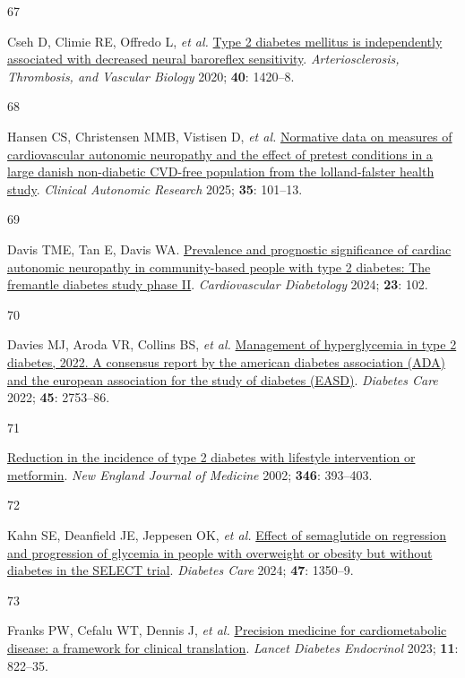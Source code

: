 \documentclass[
  letterpaper,
  headsepline=true,
  open=any]{scrbook}
\newlength{\cslhangindent}
\newlength{\csllabelwidth}
\newlength{\cslentryspacingunit} %
\newenvironment{CSLReferences}[2] %
 {%
  \setlength{\parindent}{0pt}
  \ifodd #1
  \let\oldpar\par
  \def\par{\hangindent=\cslhangindent\oldpar}
  \fi
  \setlength{\parskip}{#2\cslentryspacingunit}
 }%
 {}
\newcommand{\CSLLeftMargin}[1]{\parbox[t]{\csllabelwidth}{#1}}
\newcommand{\CSLRightInline}[1]{\parbox[t]{\linewidth - \csllabelwidth}{#1}\break}
\begin{document}
\begin{CSLReferences}{0}{0}
\leavevmode{}%
\CSLLeftMargin{67 }%
\CSLRightInline{Cseh D, Climie RE, Offredo L, \emph{et al.}
\href{https://doi.org/10.1161/ATVBAHA.120.314102}{Type 2 diabetes
mellitus is independently associated with decreased neural baroreflex
sensitivity}. \emph{Arteriosclerosis, Thrombosis, and Vascular Biology}
2020; \textbf{40}: 1420--8.}

\leavevmode{}%
\CSLLeftMargin{68 }%
\CSLRightInline{Hansen CS, Christensen MMB, Vistisen D, \emph{et al.}
\href{https://doi.org/10.1007/s10286-024-01069-6}{Normative data on
measures of cardiovascular autonomic neuropathy and the effect of
pretest conditions in a large danish non-diabetic CVD-free population
from the lolland-falster health study}. \emph{Clinical Autonomic
Research} 2025; \textbf{35}: 101--13.}

\leavevmode{}%
\CSLLeftMargin{69 }%
\CSLRightInline{Davis TME, Tan E, Davis WA.
\href{https://doi.org/10.1186/s12933-024-02185-3}{Prevalence and
prognostic significance of cardiac autonomic neuropathy in
community-based people with type 2 diabetes: The fremantle diabetes
study phase II}. \emph{Cardiovascular Diabetology} 2024; \textbf{23}:
102.}

\leavevmode{}%
\CSLLeftMargin{70 }%
\CSLRightInline{Davies MJ, Aroda VR, Collins BS, \emph{et al.}
\href{https://doi.org/10.2337/dci22-0034}{Management of hyperglycemia in
type 2 diabetes, 2022. A consensus report by the american diabetes
association (ADA) and the european association for the study of diabetes
(EASD)}. \emph{Diabetes Care} 2022; \textbf{45}: 2753--86.}

\leavevmode{}%
\CSLLeftMargin{71 }%
\CSLRightInline{\href{https://doi.org/10.1056/NEJMoa012512}{Reduction in
the incidence of type 2 diabetes with lifestyle intervention or
metformin}. \emph{New England Journal of Medicine} 2002; \textbf{346}:
393--403.}

\leavevmode{}%
\CSLLeftMargin{72 }%
\CSLRightInline{Kahn SE, Deanfield JE, Jeppesen OK, \emph{et al.}
\href{https://doi.org/10.2337/dc24-0491}{Effect of semaglutide on
regression and progression of glycemia in people with overweight or
obesity but without diabetes in the SELECT trial}. \emph{Diabetes Care}
2024; \textbf{47}: 1350--9.}

\leavevmode{}%
\CSLLeftMargin{73 }%
\CSLRightInline{Franks PW, Cefalu WT, Dennis J, \emph{et al.}
\href{https://doi.org/10.1016/s2213-8587(23)00165-1}{Precision medicine
for cardiometabolic disease: a framework for clinical translation}.
\emph{Lancet Diabetes Endocrinol} 2023; \textbf{11}: 822--35.}


\end{CSLReferences}
\end{document}
